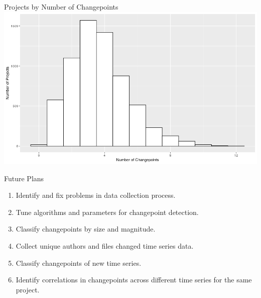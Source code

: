 \documentclass[11pt,handout]{beamer}
\begin{document}
\begin{frame}{Projects by Number of Changepoints}
    \includegraphics[width=\textwidth,keepaspectratio]{project-changepoints.png}
\end{frame}

\begin{frame}{Future Plans}
    \begin{enumerate}
        \item Identify and fix problems in data collection process.
        \item Tune algorithms and parameters for changepoint detection.
        \item Classify changepoints by size and magnitude.
        \item Collect unique authors and files changed time series data.
        \item Classify changepoints of new time series.
        \item Identify correlations in changepoints across different time series for the same project.
    \end{enumerate}
\end{frame}
\end{document}
